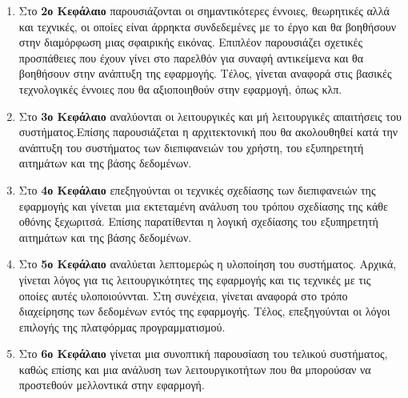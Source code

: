 \begin{enumerate}
\item Στο \textbf{2ο Κεφάλαιο} παρουσιάζονται οι σημαντικότερες έννοιες, θεωρητικές αλλά και τεχνικές, οι οποίες είναι άρρηκτα συνδεδεμένες με το έργο και θα βοηθήσουν στην διαμόρφωση μιας σφαιρικής εικόνας. Επιπλέον παρουσιάζει σχετικές προσπάθειες που έχουν γίνει στο παρελθόν για συναφή αντικείμενα και θα βοηθήσουν στην ανάπτυξη της εφαρμογής. Τέλος, γίνεται αναφορά στις βασικές τεχνολογικές έννοιες που θα αξιοποιηθούν στην εφαρμογή, όπως  κλπ.
\item Στο \textbf{3ο Κεφάλαιο} αναλύονται οι λειτουργικές και μή λειτουργικές απαιτήσεις του συστήματος.Επίσης παρουσιάζεται η αρχιτεκτονική που θα ακολουθηθεί κατά την ανάπτυξη του συστήματος των διεπιφανειών του χρήστη, του εξυπηρετητή αιτημάτων και της βάσης δεδομένων.  
\item Στο \textbf{4ο Κεφάλαιο} επεξηγούνται οι τεχνικές σχεδίασης των διεπιφανειών της εφαρμογής και γίνεται μια εκτεταμένη ανάλυση του τρόπου σχεδίασης της κάθε οθόνης ξεχωριτσά. Επίσης παρατίθενται η λογική σχεδίασης του εξυπηρετητή αιτημάτων και της βάσης δεδομένων.
\item Στο \textbf{5ο Κεφάλαιο} αναλύεται λεπτομερώς η υλοποίηση του συστήματος. Αρχικά, γίνεται λόγος για τις λειτουργικότητες της εφαρμογής και τις τεχνικές με τις οποίες αυτές υλοποιούννται. Στη συνέχεια, γίνεται αναφορά στο τρόπο διαχείρησης των δεδομένων εντός της εφαρμογής. Τέλος, επεξηγούνται οι λόγοι επιλογής της πλατφόρμας προγραμματισμού. 
\item Στο \textbf{6ο Κεφάλαιο} γίνεται μια συνοπτική παρουσίαση του τελικού συστήματος, καθώς επίσης και μια ανάλυση των λειτουργικοτήτων που θα μπορούσαν να προστεθούν μελλοντικά στην εφαρμογή.  
\end{enumerate}





